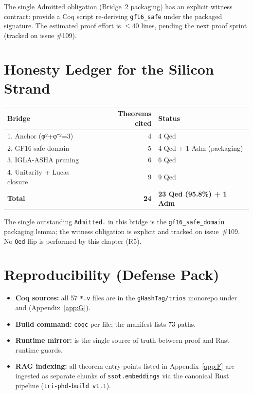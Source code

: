 The single Admitted obligation (Bridge~2 packaging) has an explicit witness contract: provide a Coq script re-deriving \texttt{gf16\_safe} under the packaged signature. The estimated proof effort is $\leq 40$ lines, pending the next proof sprint (tracked on issue \#109).

\section{Honesty Ledger for the Silicon Strand}

\begin{tabular}{lrl}
\toprule
\textbf{Bridge} & \textbf{Theorems cited} & \textbf{Status} \\
\midrule
1. Anchor (φ²+φ⁻²=3)            & 4 & 4 Qed \\
2. GF16 safe domain             & 5 & 4 Qed + 1 Adm (packaging) \\
3. IGLA-ASHA pruning            & 6 & 6 Qed \\
4. Unitarity + Lucas closure    & 9 & 9 Qed \\
\midrule
\textbf{Total}                  & \textbf{24} & \textbf{23 Qed (95.8\%) + 1 Adm} \\
\bottomrule
\end{tabular}

The single outstanding \texttt{Admitted.} in this bridge is the
\texttt{gf16\_safe\_domain} packaging lemma; the witness obligation is
explicit and tracked on issue~\#109. No \texttt{Qed} flip is performed by
this chapter (R5).

\section{Reproducibility (Defense Pack)}

\begin{itemize}
  \item \textbf{Coq sources:} all 57 \texttt{*.v} files are in the
        \texttt{gHashTag/trios} monorepo under
         and
         (Appendix~\ref{app:G}).
  \item \textbf{Build command:} \texttt{coqc} per file; the
         manifest lists 73 paths.
  \item \textbf{Runtime mirror:} 
        is the single source of truth between proof and Rust runtime guards.
  \item \textbf{RAG indexing:} all theorem entry-points listed in
        Appendix~\ref{app:F} are ingested as separate chunks of
        \texttt{ssot.embeddings} via the canonical Rust pipeline
        (\texttt{tri-phd-build v1.1}).
\end{itemize}

